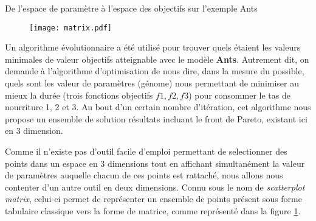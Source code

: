 

\pagebreak

\begin{testiv}{De l'espace de paramètre à l'espace des objectifs sur l'exemple Ants }{}

\begin{figure}[H]
	 \centering
	 	\texttt{[image: matrix.pdf]}
	 	\label{fig:matrice}
\end{figure}

Un algorithme évolutionnaire a été utilisé pour trouver quels étaient les valeurs minimales de valeur objectifs atteignable avec le modèle \textbf{Ants}. Autrement dit, on demande à l'algorithme d'optimisation de nous dire, dans la mesure du possible, quels sont les valeur de paramètres (génome) nous permettant de minimiser au mieux la durée (trois fonctions objectifs ${f1,f2,f3}$) pour consommer le tas de nourriture 1, 2 et 3. Au bout d'un certain nombre d'itération, cet algorithme nous propose un ensemble de solution résultats incluant le front de Pareto, existant ici en 3 dimension.

Comme il n'existe pas d'outil facile d'emploi permettant de selectionner des points dans un espace en 3 dimensions tout en affichant simultanément la valeur de paramètres auquelle chacun de ces points est rattaché, nous allons nous contenter d'un autre outil en deux dimensions. Connu sous le nom de \textit{scatterplot matrix}, celui-ci permet de représenter un ensemble de points présent sous forme tabulaire classique vers la forme de matrice, comme représenté dans la figure \ref{fig:matrice}.


\end{testiv}
